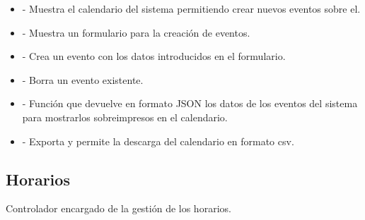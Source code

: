 \begin{itemize}
\item {} - Muestra el calendario del sistema permitiendo crear nuevos eventos sobre el.
\item {} - Muestra un formulario para la creación de eventos.
\item {} - Crea un evento con los datos introducidos en el formulario.
\item {} - Borra un evento existente.
\item {} - Función que devuelve en formato JSON los datos de los eventos del sistema para mostrarlos sobreimpresos en el calendario.
\item {} - Exporta y permite la descarga del calendario en formato csv.
\end{itemize}

\subsection{Horarios}

Controlador encargado de la gestión de los horarios.

